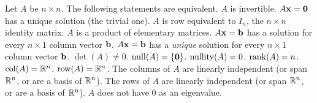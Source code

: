 \begin{frame}
\begin{theorem}
Let $A$ be $n\times n$. The following statements are equivalent. 
\bb[(a)]
\ii $A$ is invertible.
\ii $A{\mathbf x}={\mathbf 0}$ has a unique solution (the trivial one). 
\ii $A$ is row equivalent to $I_n$, the $n\times n$ identity matrix.
\ii $A$ is a product of elementary matrices. 	
\ii $A{\mathbf x}={\mathbf b}$ has a solution for every $n\times 1$ column vector ${\mathbf b}$. 
\ii $A{\mathbf x}={\mathbf b}$ has a {\em unique} solution for every $n\times 1$ column vector ${\mathbf b}$. 
\ii $\det(A)\ne 0$.
\ii $\operatorname{null}(A)=\{{\mathbf 0}\}$.
\ii $\operatorname{nullity}(A)=0$.
\ii $\operatorname{rank}(A)=n$. 
\ii $\operatorname{col}(A)={\mathbb R}^n$.
\ii $\operatorname{row}(A)={\mathbb R}^n$.
\ii The columns of $A$ are linearly independent (or span ${\mathbb R}^n$, or are a basis of ${\mathbb R}^n$).
\ii The rows of $A$ are linearly independent (or span ${\mathbb R}^n$, or are a basis of ${\mathbb R}^n$). 
\ii $A$ does not have 0 as an eigenvalue. 
\ee
\end{theorem}

\end{frame}
